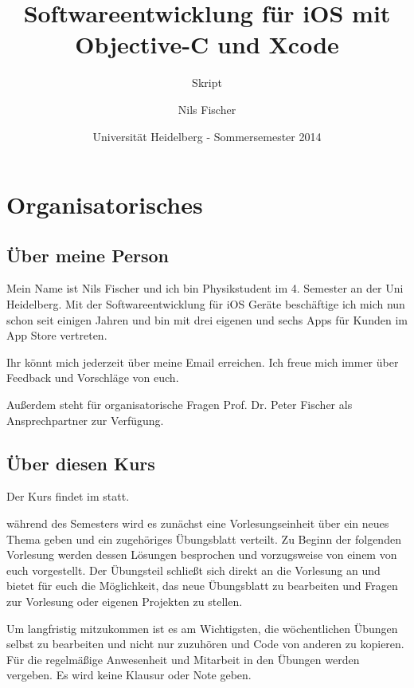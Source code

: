 \documentclass[parskip=half, final]{scrreprt}
\subtitle{Skript}
\title{Softwareentwicklung für iOS mit Objective-C und Xcode}
\author{Nils Fischer}
\date{Universität Heidelberg - Sommersemester 2014}
\begin{document}
\maketitle

\tableofcontents


\chapter{Organisatorisches}

\section{Über meine Person}

Mein Name ist Nils Fischer und ich bin Physikstudent im 4. Semester an der Uni Heidelberg. Mit der Softwareentwicklung für iOS Geräte beschäftige ich mich nun schon seit einigen Jahren und bin mit drei eigenen und sechs Apps für Kunden im App Store vertreten.

Ihr könnt mich jederzeit über meine Email  erreichen. Ich freue mich immer über Feedback und Vorschläge von euch.

Außerdem steht für organisatorische Fragen Prof. Dr. Peter Fischer  als Ansprechpartner zur Verfügung.

\section{Über diesen Kurs}

Der Kurs findet im  statt.

 während des Semesters wird es zunächst eine Vorlesungseinheit über ein neues Thema geben und ein zugehöriges Übungsblatt verteilt. Zu Beginn der folgenden Vorlesung werden dessen Lösungen besprochen und vorzugsweise von einem von euch vorgestellt. Der Übungsteil schließt sich direkt an die Vorlesung an und bietet für euch die Möglichkeit, das neue Übungsblatt zu bearbeiten und Fragen zur Vorlesung oder eigenen Projekten zu stellen.

Um langfristig mitzukommen ist es am Wichtigsten, die wöchentlichen Übungen selbst zu bearbeiten und nicht nur zuzuhören und Code von anderen zu kopieren. Für die regelmäßige Anwesenheit und Mitarbeit in den Übungen werden  vergeben. Es wird keine Klausur oder Note geben.
\end{document}
